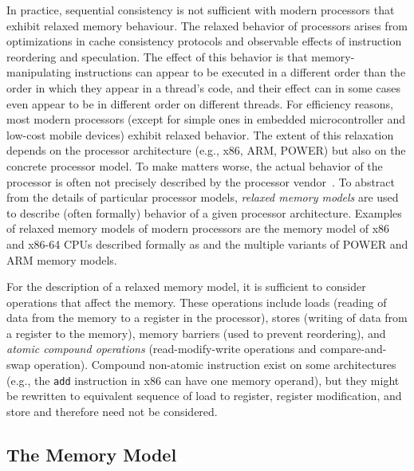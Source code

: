 In practice, sequential consistency is not sufficient with modern processors
that exhibit relaxed memory behaviour.
The relaxed behavior of processors arises from optimizations in cache
consistency protocols and observable effects of instruction reordering and
speculation.
The effect of this behavior is that memory-manipulating instructions can appear
to be executed in a different order than the order in which they appear in a
thread's code, and their effect can in some cases even appear to be in
different order on different threads.
For efficiency reasons, most modern processors (except for simple ones in
embedded microcontroller and low-cost mobile devices) exhibit relaxed behavior.
The extent of this relaxation depends on the processor architecture (e.g.,
x86, ARM, POWER) but also on the concrete processor model.
To make matters worse, the actual behavior of the processor is often not
precisely described by the processor vendor~.
To abstract from the details of particular processor models, \emph{relaxed
memory models} are used to describe (often formally) behavior of a given
processor architecture.
Examples of relaxed memory models of modern processors are the memory model of
x86 and x86-64 CPUs described formally as \xtso {} and the multiple
variants of POWER  and
ARM  memory models.

For the description of a relaxed memory model, it is sufficient to consider
operations that affect the memory.
These operations include loads (reading of data from the memory to a register
in the processor), stores (writing of data from a register to the memory),
memory barriers (used to prevent reordering), and \emph{atomic compound
operations} (read-modify-write operations and compare-and-swap operation).
Compound non-atomic instruction exist on some architectures (e.g., the
\texttt{add} instruction in x86 can have one memory operand), but they
might be rewritten to equivalent sequence of load to register, register
modification, and store and therefore need not be considered.

\subsection{The \xtso Memory Model\protect\mnotemark}\label{chap:prelim:xtso}%

